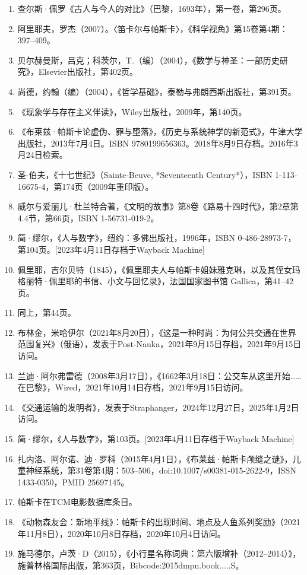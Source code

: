 \begin{enumerate}
\item 查尔斯·佩罗《古人与今人的对比》（巴黎，1693年），第一卷，第296页。
\item 阿里耶夫，罗杰（2007）。〈笛卡尔与帕斯卡〉，《科学视角》第15卷第4期：397–409。
\item 贝尔赫曼斯，吕克；科茨尔，T.（编）（2004），《数学与神圣：一部历史研究》，Elsevier出版社，第402页。
\item 尚德，约翰（编）（2004），《哲学基础》，泰勒与弗朗西斯出版社，第391页。
\item 《现象学与存在主义伴读》，Wiley出版社，2009年，第140页。
\item 《布莱兹·帕斯卡论虚伪、罪与堕落》，《历史与系统神学的新范式》，牛津大学出版社，2013年7月4日。ISBN 9780199656363。2018年8月9日存档。2016年3月24日检索。
\item 圣-伯夫，《十七世纪》（Sainte-Beuve, *Seventeenth Century*），ISBN 1-113-16675-4，第174页（2009年重印版）。
\item 威尔与爱丽儿·杜兰特合著，《文明的故事》第8卷《路易十四时代》，第2章第4.4节，第66页，ISBN 1-56731-019-2。
\item 简·缪尔，《人与数字》，纽约：多佛出版社，1996年，ISBN 0-486-28973-7，第104页。[2023年4月11日存档于Wayback Machine]
\item 佩里耶，吉尔贝特（1845），《佩里耶夫人与帕斯卡姐妹雅克琳，以及其侄女玛格丽特·佩里耶的书信、小文与回忆录》，法国国家图书馆 Gallica，第41–42页。
\item 同上，第44页。
\item 布林金，米哈伊尔（2021年8月20日），《这是一种时尚：为何公共交通在世界范围复兴》（俄语），发表于Post-Nauka，2021年9月15日存档，2021年9月15日访问。
\item 兰迪·阿尔弗雷德（2008年3月17日），《1662年3月18日：公交车从这里开始……在巴黎》，Wired，2021年10月14日存档，2021年9月15日访问。
\item 《交通运输的发明者》，发表于Straphanger，2024年12月27日，2025年1月2日访问。
\item 简·缪尔，《人与数字》，第103页。[2023年4月11日存档于Wayback Machine]
\item 扎内洛、阿尔诺、迪·罗科（2015年4月1日），《布莱兹·帕斯卡颅缝之谜》，儿童神经系统，第31卷第4期：503–506，doi:10.1007/s00381-015-2622-9，ISSN 1433-0350，PMID 25697145。
\item 帕斯卡在TCM电影数据库条目。
\item 《动物森友会：新地平线》：帕斯卡的出现时间、地点及人鱼系列奖励》（2021年11月8日），2020年10月8日存档，2020年10月4日访问。
\item 施马德尔，卢茨·D（2015），《小行星名称词典：第六版增补（2012–2014）》，施普林格国际出版，第363页，Bibcode:2015dmpn.book.....S。

\end{enumerate}
